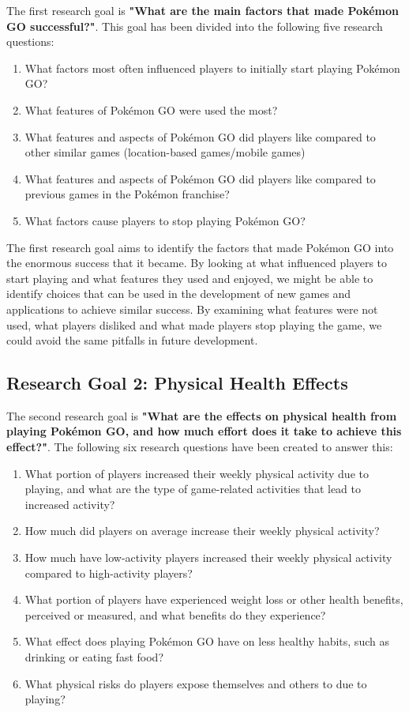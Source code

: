 The first research goal is \textbf{"What are the main factors that made Pokémon GO successful?"}. This goal has been divided into the following five research questions:

\begin{enumerate}
	\item What factors most often influenced players to initially start playing Pokémon GO?
	\item What features of Pokémon GO were used the most?
	\item What features and aspects of Pokémon GO did players like compared to other similar games (location-based games/mobile games)
	\item What features and aspects of Pokémon GO did players like compared to previous games in the Pokémon franchise?
	\item What factors cause players to stop playing Pokémon GO?
\end{enumerate}

The first research goal aims to identify the factors that made Pokémon GO into the enormous success that it became. By looking at what influenced players to start playing and what features they used and enjoyed, we might be able to identify choices that can be used in the development of new games and applications to achieve similar success. By examining what features were not used, what players disliked and what made players stop playing the game, we could avoid the same pitfalls in future development.

\subsection{Research Goal 2: Physical Health Effects}
\label{rg2}

The second research goal is \textbf{"What are the effects on physical health from playing Pokémon GO, and how much effort does it take to achieve this effect?"}. The following six research questions have been created to answer this:

\begin{enumerate}
	\item What portion of players increased their weekly physical activity due to playing, and what are the type of game-related activities that lead to increased activity?
	\item How much did players on average increase their weekly physical activity?
	\item How much have low-activity players increased their weekly physical activity compared to high-activity players?
	\item What portion of players have experienced weight loss or other health benefits, perceived or measured, and what benefits do they experience?
	\item What effect does playing Pokémon GO have on less healthy  habits, such as drinking or eating fast food?
	\item What physical risks do players expose themselves and others to due to playing?
\end{enumerate}


